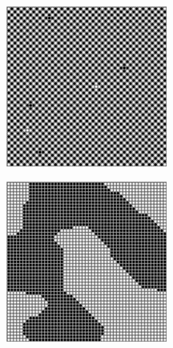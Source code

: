 \documentclass[a4paper,12pt, oneside]{book}
\begin{document}
  \begin{center}
  	\begin{minipage}{0.46\linewidth}
  		\includegraphics[width=\linewidth]{"Immagini/modello di segregazione 2"}
  		\label{fig:modello di segregazione 2}
  	\end{minipage}%
  	\hfill
  	\begin{minipage}{0.46\linewidth}
  		\includegraphics[width=\linewidth]{"Immagini/modello di segregazione 1"}
  		\label{fig:modello di segregazione 1}
  	\end{minipage}
  \end{center}
\end{document}
